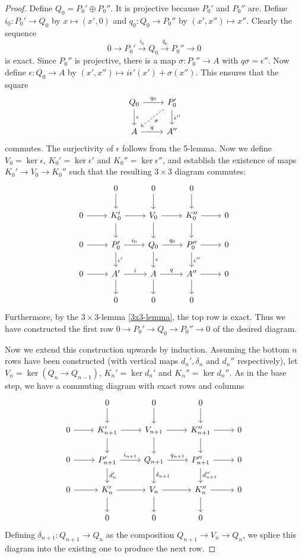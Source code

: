 \begin{proof}
     Define $Q_0=P_0'\oplus P_0''$. It is projective because $P_0'$ and $P_0''$ are. Define $i_0:P_0'\to Q_0$ by $x\mapsto (x',0)$ and $q_0:Q_0\to P_0''$ by $(x',x'')\mapsto x''$. Clearly the sequence
     \[0\to P_0'\overset{i_0}\to Q_0\overset{q_0}\to P_0''\to 0\]
     is exact. Since $P_0''$ is projective, there is a map $\sigma:P_0''\to A$ with $q\sigma=\epsilon''$. Now define $\epsilon:Q_0\to A$ by $(x',x'')\mapsto i\epsilon '(x')+\sigma(x'')$. This ensures that the square 
     \[\begin{tikzcd}
     Q_0\ar[r,"q_0"]\ar[d,"\epsilon"] & P_0'\ar[d,"\epsilon''"]\ar[dl,dashed,"\sigma"] \\
     A\ar[r,"q"]& A''
     \end{tikzcd}\]
     commutes. The surjectivity of $\epsilon$ follows from the 5-lemma. Now we define $V_0=\ker \epsilon$, $K_0'=\ker \epsilon '$ and $K_0''=\ker\epsilon''$, and establish the existence of maps $K_0'\to V_0\to K_0''$ such that the resulting $3\times 3$ diagram commutes:
     \[\begin{tikzcd}
        &0\arrow[d]&0\arrow[d]&0\arrow[d]&\\
        0\arrow[r]& K_0' \arrow[r]\arrow[d,""] & V_0\arrow[r]\arrow[d] & K_0'' \arrow[r]\arrow[d] & 0\\
        0\arrow[r]& P_0' \arrow[r,"i_0"]\arrow[d,"\epsilon'"] & Q_0\arrow[r,"q_0"]\arrow[d,"\epsilon"] & P_0'' \arrow[r]\arrow[d,"\epsilon''"] & 0\\
       0\arrow[r]& A'\arrow[r,"i"]\arrow[d] & A\arrow[r,"q"]\arrow[d] & A''\arrow[r]\arrow[d] &0\\
       &0&0&0&
    \end{tikzcd}\]
    Furthermore, by the $3\times 3$-lemma \ref{3x3-lemma}, the top row is exact. Thus we have constructed the first row $0\to P_0'\to Q_0\to P_0''\to 0$ of the desired diagram.
    
    Now we extend this construction upwards by induction. Assuming the bottom $n$ rows have been constructed (with vertical maps $d_n',\delta_n$ and $d_n''$ respectively), let $V_n=\ker (Q_n\to Q_{n-1})$, $K_n'=\ker d_n'$ and $K_n''=\ker d_n''$. As in the base step, we have a commuting diagram with exact rows and columns
    \[\begin{tikzcd}
        &0\arrow[d]&0\arrow[d]&0\arrow[d]&\\
        0\arrow[r]& K_{n+1}' \arrow[r]\arrow[d,""] & V_{n+1}\arrow[r]\arrow[d] & K_{n+1}'' \arrow[r]\arrow[d] & 0\\
        0\arrow[r]& P_{n+1}' \arrow[r,"i_{n+1}"]\arrow[d,"d_n'"] & Q_{n+1}\arrow[r,"q_{n+1}"]\arrow[d,"\delta_{n+1}"] & P_{n+1}'' \arrow[r]\arrow[d,"d_{n+1}''"] & 0\\
       0\arrow[r]& K_n'\arrow[r]\arrow[d] & V_n\arrow[r]\arrow[d] & K_n''\arrow[r]\arrow[d] &0\\
       &0&0&0&
    \end{tikzcd}\]
    Defining $\delta_{n+1}:Q_{n+1}\to Q_n$ as the composition $Q_{n+1}\to V_n\to Q_n$, we splice this diagram into the existing one to produce the next row.
\end{proof}
